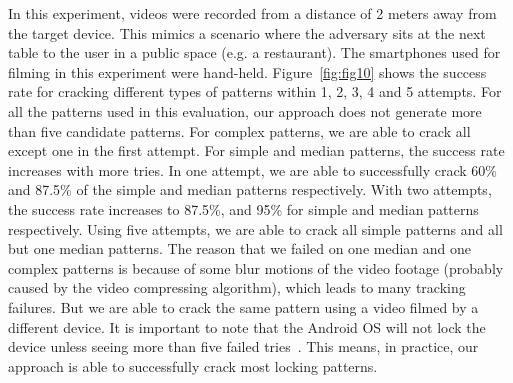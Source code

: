         In this experiment, videos were recorded from a distance of 2 meters away
        from the target device. This mimics a scenario where the adversary sits
        at the next table to the user in a public space (e.g. a restaurant).
        The smartphones used for filming in this experiment were hand-held.
        Figure~\ref{fig:fig10}
        shows the success rate for cracking different types of patterns within 1, 2, 3, 4 and 5 attempts.     For all the patterns used in this evaluation,
        our approach does not generate more than  five candidate patterns.
        For complex patterns, we are able to crack all except one in the first attempt.
        For simple and median patterns, the success rate increases with more tries.
        In one attempt, we are able to
        successfully crack 60\% and 87.5\% of the simple and median patterns respectively. With two attempts, the success rate increases to 87.5\%,
        and 95\% for simple and median patterns
        respectively. Using five attempts, we are able to
        crack all simple patterns and all but one median patterns.
       The reason that we failed on one median and one complex patterns is because of some blur motions of the video footage (probably
       caused by the video compressing algorithm), which leads
       to many tracking failures. But we are able to crack the same
       pattern using a video filmed by a different device.
        It is important to note that the Android OS will not lock the device unless seeing
        more than five failed tries~\cite{egelman2014you}. This means, in practice, our approach is able to
        successfully crack most locking patterns.

